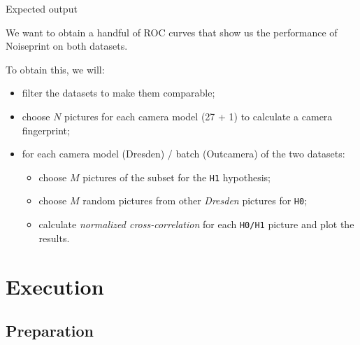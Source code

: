 \begin{frame}{Expected output}

    We want to obtain a handful of ROC curves that show us the performance of Noiseprint on both datasets.
    
    \medskip
    
    To obtain this, we will:
    
    \begin{itemize}
        \item<2-> filter the datasets to make them comparable;
        \item<3-> choose $N$ pictures for each camera model (27 + 1) to calculate a camera fingerprint;
        \item<4-> for each camera model (Dresden) / batch (Outcamera) of the two datasets: \begin{itemize}
            \item choose $M$ pictures of the subset for the \texttt{H1} hypothesis;
            \item choose $M$ random pictures from other \textit{Dresden} pictures for \texttt{H0};
            \item calculate \textit{normalized cross-correlation} for each \texttt{H0/H1} picture and plot the results.
        \end{itemize}
    \end{itemize}
    
    
\end{frame}

\section{Execution}

\subsection{Preparation}

